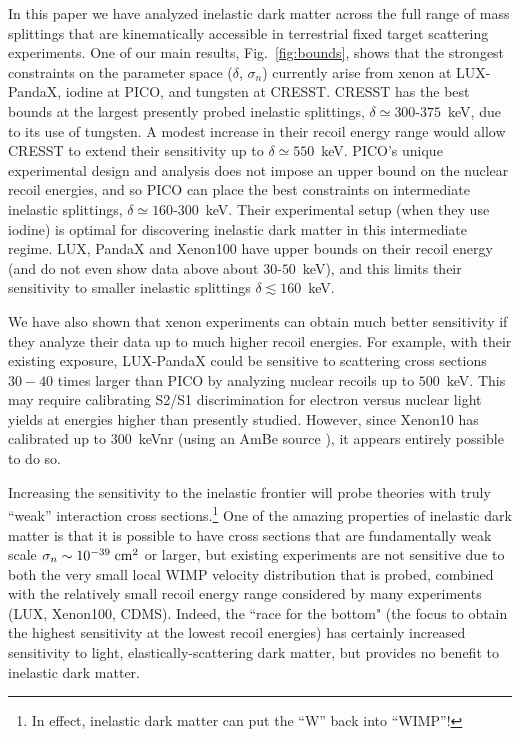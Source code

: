 \documentclass[11pt]{article}
\begin{document}
In this paper we have analyzed inelastic dark matter across the full range of mass splittings that are kinematically accessible in terrestrial fixed target scattering experiments.  One of our main results, Fig.~\ref{fig:bounds}, shows that the strongest constraints on the parameter space ($\delta$, $\sigma_n$) currently arise from xenon at LUX-PandaX, iodine at PICO, and tungsten at CRESST.  CRESST has the best bounds at the largest presently probed inelastic splittings, $\delta \simeq 300$-$375$~keV, due to its use of tungsten.  A modest increase in their recoil energy range would allow CRESST to extend their sensitivity up to $\delta \simeq 550$~keV\@.  PICO's unique experimental design and analysis does not impose an upper bound on the nuclear recoil energies, and so PICO can place the best constraints on intermediate inelastic splittings, $\delta \simeq 160$-$300$~keV\@.  Their experimental setup (when they use iodine) is optimal for discovering inelastic dark matter in this intermediate regime.  LUX, PandaX and Xenon100 have upper bounds on their recoil energy (and do not even show data above about $30$-$50$~keV), and this limits their sensitivity to smaller inelastic splittings $\delta \lesssim 160$~keV\@. 

We have also shown that xenon experiments can obtain much better sensitivity if they analyze their data up to much higher recoil energies.  For example, with their existing exposure, LUX-PandaX could be sensitive to scattering cross sections $30-40$ times larger than PICO by analyzing nuclear recoils up to $500$~keV\@.  This may require calibrating S2/S1 discrimination for electron versus nuclear light yields at energies higher than presently studied.  However, since Xenon10 has calibrated up to $300$~keVnr (using an AmBe source \cite{Angle:2009xb,Sorensen:2011bd}), it appears entirely possible to do so.

Increasing the sensitivity to the inelastic frontier will probe theories with truly ``weak'' interaction cross sections.\footnote{In effect, inelastic dark matter can put the ``W'' back into ``WIMP''!}  One of the amazing properties of inelastic dark matter is that it is possible to have cross sections that are fundamentally weak scale $\sigma_n \sim 10^{-39} \; {\rm cm}^2$ or larger, but existing experiments are not sensitive due to both the very small local WIMP velocity distribution that is probed, combined with the relatively small recoil energy range considered by many experiments (LUX, Xenon100, CDMS).  Indeed, the ``race for the bottom" (the focus to obtain the highest sensitivity at the lowest recoil energies) has certainly increased sensitivity to light, elastically-scattering dark matter, but provides no benefit to inelastic dark matter.
\end{document}
